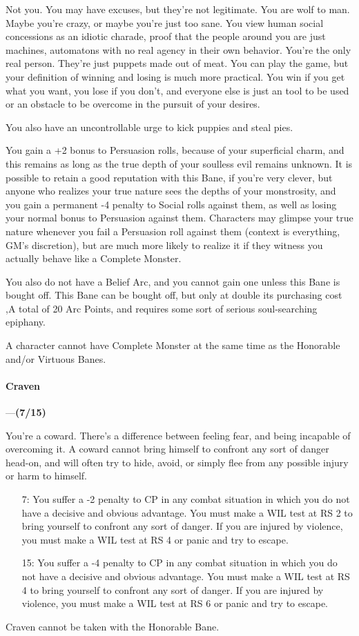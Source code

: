 \documentclass[oneside,11pt,english]{book}
\begin{document}
Not you. You may have excuses, but they're not legitimate. You are wolf to man. Maybe you're crazy, or maybe you're just too sane. You view human social concessions as an idiotic charade, proof that the 
people around you are just machines, automatons with no real agency in their own behavior. You're the 
only real person. They're just puppets made out of meat. You can play the game, but your definition of 
winning and losing is much more practical. You win if you get what you want, you lose if you don't, and 
everyone else is just an tool to be used or an obstacle to be overcome in the pursuit of your desires. 


You also have an uncontrollable urge to kick puppies and steal pies. 


You gain a +2 bonus to Persuasion rolls, because of your superficial charm, and this remains as long as 
the true depth of your soulless evil remains unknown. It is possible to retain a good reputation with this 
Bane, if you're very clever, but anyone who realizes your true nature sees the depths of your monstrosity, 
and you gain a permanent -4 penalty to Social rolls against them, as well as losing your normal bonus to 
Persuasion against them. Characters may glimpse your true nature whenever you fail a Persuasion roll 
against them (context is everything, GM's discretion), but are much more likely to realize it if they 
witness you actually behave like a Complete Monster. 


You also do not have a Belief Arc, and you cannot gain one unless this Bane is bought off. This Bane can be bought off, but only at double its purchasing cost ,A total of 20 Arc Points, and requires some sort of serious soul-searching epiphany. 


A character cannot have Complete Monster at the same time as the Honorable and/or Virtuous Banes. 
\paragraph{\label{bane:Craven}Craven}---\quad\textbf{(7/15) }\par
You're a coward. There's a difference between feeling fear, and being incapable of overcoming it. A 
coward cannot bring himself to confront any sort of danger head-on, and will often try to hide, avoid, or 
simply flee from any possible injury or harm to himself. 

\begin{itemize}
	\item [7:] You suffer a -2 penalty to CP in any combat situation in which you do not have a decisive and obvious advantage. You must make a WIL test at RS 2 to bring yourself to confront any sort of danger. If you are injured by violence, you must make a WIL test at RS 4 or panic and try to escape. 
	\item [15:] You suffer a -4 penalty to CP in any combat situation in which you do not have a decisive and obvious advantage. You must make a WIL test at RS 4 to bring yourself to confront any sort of danger. If you are injured by violence, you must make a WIL test at RS 6 or panic and try to escape.
\end{itemize}
Craven cannot be taken with the Honorable Bane. 
\end{document}
